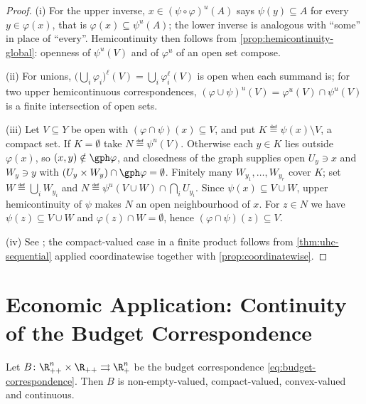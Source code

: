 \begin{proof}
	(i) For the upper inverse,
	$x\in(\psi\circ\varphi)^{u}(A)$ says $\psi(y)\subseteq A$ for every
	$y\in\varphi(x)$, that is $\varphi(x)\subseteq\psi^{u}(A)$; the lower inverse is
	analogous with ``some'' in place of ``every''. Hemicontinuity then follows from
	\autoref{prop:hemicontinuity-global}: openness of $\psi^{u}(V)$ and of
	$\varphi^{u}$ of an open set compose.

	(ii) For unions, $\bigl(\bigcup_i\varphi_i\bigr)^{\ell}(V)
		=\bigcup_i\varphi_i^{\ell}(V)$ is open when each summand is; for two upper
	hemicontinuous correspondences,
	$(\varphi\cup\psi)^{u}(V)=\varphi^{u}(V)\cap\psi^{u}(V)$ is a finite
	intersection of open sets.

	(iii) Let $V\subseteq Y$ be open with $(\varphi\cap\psi)(x)\subseteq V$, and put
	$K\eqdef\psi(x)\setminus V$, a compact set. If $K=\emptyset$ take
	$N\eqdef\psi^{u}(V)$. Otherwise each $y\in K$ lies outside $\varphi(x)$, so
	$(x,y)\notin\gph\varphi$, and closedness of the graph supplies open
	$U_y\ni x$ and $W_y\ni y$ with $(U_y\times W_y)\cap\gph\varphi=\emptyset$.
	Finitely many $W_{y_1},\dots,W_{y_r}$ cover $K$; set $W\eqdef\bigcup_iW_{y_i}$
	and $N\eqdef\psi^{u}(V\cup W)\cap\bigcap_{i}U_{y_i}$. Since
	$\psi(x)\subseteq V\cup W$, upper hemicontinuity of $\psi$ makes $N$ an open
	neighbourhood of $x$. For $z\in N$ we have $\psi(z)\subseteq V\cup W$ and
	$\varphi(z)\cap W=\emptyset$, hence $(\varphi\cap\psi)(z)\subseteq V$.

	(iv) See \textcite[Thm.~17.28]{aliprantis2006infinite}; the compact-valued case
	in a finite product follows from \autoref{thm:uhc-sequential} applied
	coordinatewise together with \autoref{prop:coordinatewise}.
\end{proof}

\section{Economic Application: Continuity of the Budget Correspondence}
\label{sec:corr-budget}

\begin{proposition}\label{prop:budget-continuous}
	Let $B\colon\R^{n}_{++}\times\R_{++}\rightrightarrows\R^{n}_{+}$ be the budget
	correspondence \eqref{eq:budget-correspondence}. Then $B$ is non-empty-valued,
	compact-valued, convex-valued and continuous.
\end{proposition}


